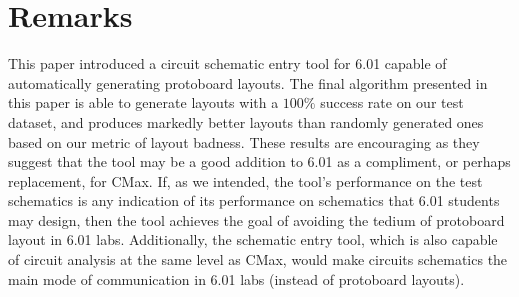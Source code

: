 \section{Remarks}

This paper introduced a circuit schematic entry tool for 6.01 capable of
automatically generating protoboard layouts. The final algorithm presented in
this paper is able to generate layouts with a $100\%$ success rate on our test
dataset, and produces markedly better layouts than randomly generated ones based
on our metric of layout badness. These results are encouraging as they suggest
that the tool may be a good addition to 6.01 as a compliment, or perhaps
replacement, for CMax. If, as
we intended, the tool's performance on the test schematics is any indication of
its performance on schematics that 6.01 students may design, then the tool
achieves the goal of avoiding the tedium of protoboard layout in 6.01 labs.
Additionally, the schematic entry tool, which is also capable of circuit
analysis at the same level as CMax, would make circuits schematics the main
mode of communication in 6.01 labs (instead of protoboard layouts).

